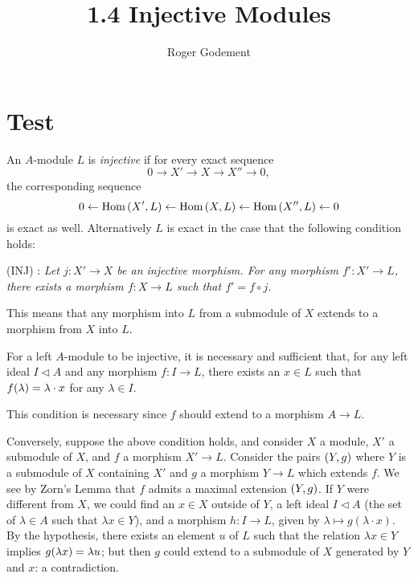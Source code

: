 \documentclass[countbysections]{./homework-math}
\title{1.4 Injective Modules}
\author{Roger Godement}
\date{\normalfont{from~\textit{Topologie alg\'ebrique et Th\'eorie de
faisceaux}}}
\begin{document}
	
\maketitle%

\smalltableofcontents%

\section{Test}

An \(A\)-module \(L\) is \emph{injective} if for every exact sequence%
\[%
	0 \to X' \to X \to X'' \to 0,
\]%
the corresponding sequence%
\[%
	0 \leftarrow \Hom\pwrap{X',L} \leftarrow \Hom\pwrap{X,L} \leftarrow
	\Hom\pwrap{X'',L} \leftarrow 0
\]%
is exact as well. Alternatively \(L\) is exact in the case that the following
condition holds:

\noindent(INJ) : \emph{%
	Let \(j: X' \to X\) be an injective morphism. For any morphism \(f': X' \to
	L\), there exists a morphism \(f: X \to L\) such that \(f' = f \circ j\).
}%

This means that any morphism into \(L\) from a submodule of \(X\) extends to a
morphism from \(X\) into \(L\).

\begin{theorem}[1.4.1]
	For a left \(A\)-module to be injective, it is necessary and sufficient that,
	for any left ideal \(I \triangleleft A\) and any morphism \(f: I \to L\),
	there exists an \(x \in L\) such that \(f{\left(\lambda\right)} = \lambda \cdot x\)
	for any \(\lambda \in I\).
\end{theorem}

This condition is necessary since \(f\) should extend to a morphism \(A \to
L\).

Conversely, suppose the above condition holds, and consider \(X\) a module,
\(X'\) a submodule of \(X\), and \(f\) a morphism \(X' \to L\). Consider the
pairs \({\left(Y,g\right)}\) where \(Y\) is a submodule of \(X\) containing \(X'\) and
\(g\) a morphism \(Y \to L\) which extends \(f\). We see by Zorn's Lemma that
\(f\) admits a maximal extension \({\left(Y,g\right)}\). If \(Y\) were different from
\(X\), we could find an \(x \in X\) outside of \(Y\), a left ideal \(I
\triangleleft A\) (the set of \(\lambda \in A\) such that \(\lambda x \in Y\)),
and a morphism \(h: I \to L\), given by \(\lambda \mapsto g(\lambda\cdot x)\).
By the hypothesis, there exists an element \(u\) of \(L\) such that the
relation \(\lambda x \in Y\) implies \(g{\left(\lambda x\right)} = \lambda u\); but
then \(g\) could extend to a submodule of \(X\) generated by \(Y\) and \(x\): a
contradiction.
\end{document}
